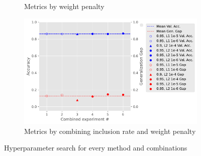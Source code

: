 {{\begin{figure}[t]
\begin{subfigure}{.3\linewidth}
        \caption{Metrics by weight penalty}
        \label{fig:weightrates}
    \end{subfigure} 
    \begin{subfigure}{.3\linewidth}
        \centering
        \includegraphics[width=1\linewidth]{figures/combined-val-acc-gen-gap-wmeans.pdf}
        \caption{Metrics by combining inclusion rate and weight penalty}
        \label{fig:extra}
    \end{subfigure} 
    \caption{Hyperparameter search for every method and combinations}
    \label{fig:hp_search}
\end{figure}
}
}


\newcommand{\questionTableOne} {
\youranswer{
%
\begin{table}[t]
    \centering
    \begin{tabular}{c|cc}
    \toprule
        \# hidden units & val. acc. & generalization gap \\
    \midrule
         32            &      77.94\%      &      0.148              \\
         64            &      80.91\%      &      0.344              \\
         128           &      80.92\%      &      0.803              \\ 
    \bottomrule
    \end{tabular}
    \caption{Validation accuracy (\%) and generalization gap (in terms of cross-entropy error) for varying network widths on the EMNIST dataset.}
    \label{tab:width_exp}
\end{table}
}
}

